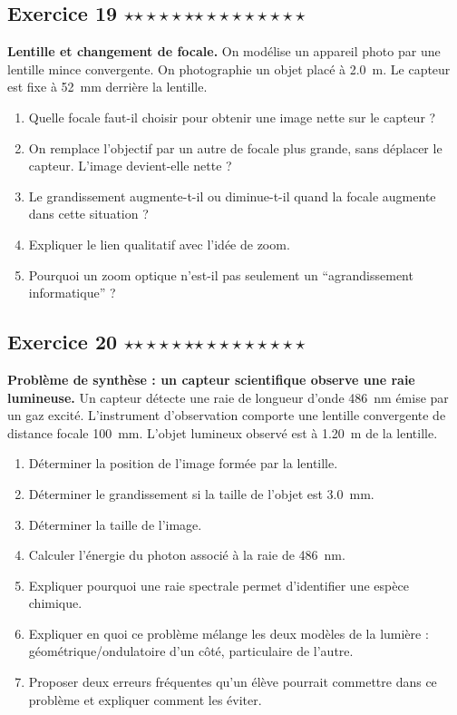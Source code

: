 \documentclass[11pt,a4paper]{article}
\newcommand{\etoiles}[1]{%
\ifcase#1\or $\star$\or $\star\star$\or $\star\star\star$\or $\star\star\star\star$\or $\star\star\star\star\star$\fi}
\newcommand{\exostar}[2]{\subsection*{Exercice #1 \hfill \etoiles{#2}}}
\begin{document}
\exostar{19}{4}
\textbf{Lentille et changement de focale.}
On modélise un appareil photo par une lentille mince convergente. On photographie un objet placé à \SI{2,0}{m}. Le capteur est fixe à \SI{52}{mm} derrière la lentille.
\begin{enumerate}[label=\alph*)]
    \item Quelle focale faut-il choisir pour obtenir une image nette sur le capteur ?
    \item On remplace l'objectif par un autre de focale plus grande, sans déplacer le capteur. L'image devient-elle nette ?
    \item Le grandissement augmente-t-il ou diminue-t-il quand la focale augmente dans cette situation ?
    \item Expliquer le lien qualitatif avec l'idée de zoom.
    \item Pourquoi un zoom optique n'est-il pas seulement un ``agrandissement informatique'' ?
\end{enumerate}

\exostar{20}{5}
\textbf{Problème de synthèse : un capteur scientifique observe une raie lumineuse.}
Un capteur détecte une raie de longueur d'onde \SI{486}{nm} émise par un gaz excité. L'instrument d'observation comporte une lentille convergente de distance focale \SI{100}{mm}. L'objet lumineux observé est à \SI{1,20}{m} de la lentille.
\begin{enumerate}[label=\alph*)]
    \item Déterminer la position de l'image formée par la lentille.
    \item Déterminer le grandissement si la taille de l'objet est \SI{3,0}{mm}.
    \item Déterminer la taille de l'image.
    \item Calculer l'énergie du photon associé à la raie de \SI{486}{nm}.
    \item Expliquer pourquoi une raie spectrale permet d'identifier une espèce chimique.
    \item Expliquer en quoi ce problème mélange les deux modèles de la lumière : géométrique/ondulatoire d'un côté, particulaire de l'autre.
    \item Proposer deux erreurs fréquentes qu'un élève pourrait commettre dans ce problème et expliquer comment les éviter.
\end{enumerate}
\end{document}
